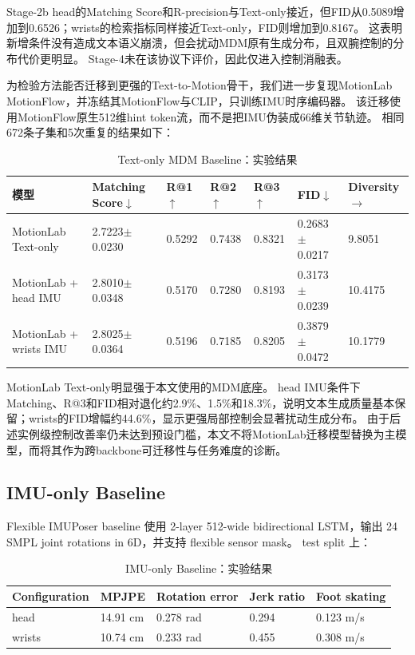 Stage-2b head的Matching Score和R-precision与Text-only接近，但FID从0.5089增加到0.6526；wrists的检索指标同样接近Text-only，FID则增加到0.8167。
这表明新增条件没有造成文本语义崩溃，但会扰动MDM原有生成分布，且双腕控制的分布代价更明显。
Stage-4未在该协议下评价，因此仅进入控制消融表。

为检验方法能否迁移到更强的Text-to-Motion骨干，我们进一步复现MotionLab MotionFlow，并冻结其MotionFlow与CLIP，只训练IMU时序编码器。
该迁移使用MotionFlow原生512维hint token流，而不是把IMU伪装成66维关节轨迹。
相同672条子集和5次重复的结果如下：

\begin{table}[t]
\centering
\caption{Text-only MDM Baseline：实验结果}
\label{tab:result-10}
\footnotesize
\setlength{\tabcolsep}{3pt}
\renewcommand{\arraystretch}{1.15}
\begin{tabularx}{\linewidth}{LLLLLLL}
\toprule
模型 & Matching Score\ensuremath{\downarrow} & R@1\ensuremath{\uparrow} & R@2\ensuremath{\uparrow} & R@3\ensuremath{\uparrow} & FID\ensuremath{\downarrow} & Diversity\ensuremath{\rightarrow} \\
\midrule
MotionLab Text-only & 2.7223\ensuremath{\pm}0.0230 & 0.5292 & 0.7438 & 0.8321 & 0.2683\ensuremath{\pm}0.0217 & 9.8051 \\
MotionLab + head IMU & 2.8010\ensuremath{\pm}0.0348 & 0.5170 & 0.7280 & 0.8193 & 0.3173\ensuremath{\pm}0.0239 & 10.4175 \\
MotionLab + wrists IMU & 2.8025\ensuremath{\pm}0.0364 & 0.5196 & 0.7185 & 0.8205 & 0.3879\ensuremath{\pm}0.0472 & 10.1779 \\
\bottomrule
\end{tabularx}
\end{table}


MotionLab Text-only明显强于本文使用的MDM底座。
head IMU条件下Matching、R@3和FID相对退化约2.9\%、1.5\%和18.3\%，说明文本生成质量基本保留；wrists的FID增幅约44.6\%，显示更强局部控制会显著扰动生成分布。
由于后述实例级控制改善率仍未达到预设门槛，本文不将MotionLab迁移模型替换为主模型，而将其作为跨backbone可迁移性与任务难度的诊断。

\subsection{IMU-only Baseline}

Flexible IMUPoser baseline 使用 2-layer 512-wide bidirectional LSTM，输出 24 SMPL joint rotations in 6D，并支持 flexible sensor mask。
test split 上：

\begin{table}[t]
\centering
\caption{IMU-only Baseline：实验结果}
\label{tab:result-11}
\footnotesize
\setlength{\tabcolsep}{3pt}
\renewcommand{\arraystretch}{1.15}
\begin{tabularx}{\linewidth}{LLLLL}
\toprule
Configuration & MPJPE & Rotation error & Jerk ratio & Foot skating \\
\midrule
head & 14.91 cm & 0.278 rad & 0.294 & 0.123 m/s \\
wrists & 10.74 cm & 0.233 rad & 0.455 & 0.308 m/s \\
\bottomrule
\end{tabularx}
\end{table}


